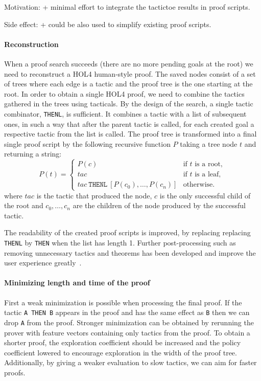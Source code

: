 \documentclass[runningheads,a4paper,draft]{svjour3}
\def\holfour{\textsf{HOL4}\xspace}
\begin{document}
Motivation: 
+ minimal effort to integrate the tactictoe results in proof scripts.

Side effect:
+ could be also used to simplify existing proof scripts. 

\paragraph{Reconstruction}
When a proof search succeeds (there are no more pending goals at the root)
we need to reconstruct a \holfour human-style proof.
The saved nodes consist of a set of trees where each edge is a tactic and
the proof tree is the one starting at the root.
In order to obtain a single \holfour proof, we need to combine the tactics
gathered in the trees using tacticals.
By the design of the search, a single tactic combinator, \texttt{THENL}, is 
sufficient. It combines a tactic with a list of subsequent ones, in such a way 
that after the parent tactic is called, for each created goal a respective 
tactic from the list is called.
The proof tree is transformed into a final single proof script
 by the following recursive function $P$ taking a
tree node $t$ and returning a string:
\begin{equation*}
P(t) =
\begin{cases}
P(c) & \text{if $t$ is a root},\\
tac & \text{if $t$ is a leaf},\\
tac\ \texttt{THENL}\ [P(c_0),\ldots,P(c_n)] & \text{otherwise.}
\end{cases}
\end{equation*}
where $tac$ is the tactic that produced the node, $c$ is the
only successful child of the root and $c_0, \ldots, c_n$ are the 
children of the node produced by the successful tactic.

The readability of the created proof scripts is improved, by replacing
replacing  \texttt{THENL} by \texttt{THEN} when the list has length 1.
Further post-processing such as
removing unnecessary tactics and theorems has been developed and
improve the user experience greatly~\cite{DBLP:conf/sefm/Adams15}.

\paragraph{Minimizing length and time of the proof} 
First a weak minimization is possible when processing the final proof. If the 
tactic \texttt{A THEN B} appears in the proof and has the same effect as 
\texttt{B} then we can drop \texttt{A} from the proof.
Stronger minimization can be obtained by rerunning the prover with feature 
vectors containing only tactics 
from the proof. To obtain a shorter proof, the exploration coefficient should be
increased and the policy coefficient lowered to encourage exploration in the 
width of the proof tree. Additionally, by giving a weaker evaluation to slow 
tactics, we can aim for faster proofs.
\end{document}
